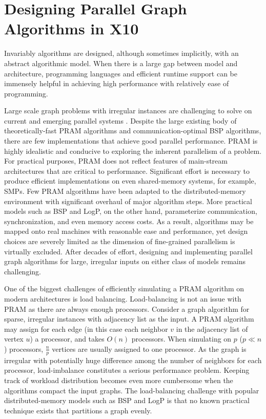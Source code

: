 
\section{Designing Parallel Graph Algorithms in X10}
\label{s:design}

 Invariably algorithms are designed, although sometimes implicitly, with an abstract algorithmic model. 
When there is a large gap between model and architecture, programming languages and efficient runtime support can be immensely helpful in achieving high performance with relatively ease of programming. 

 Large scale graph problems with irregular instances are challenging to solve on current and emerging parallel systems \cite{BC07}. Despite the large existing body of theoretically-fast PRAM algorithms and communication-optimal BSP algorithms, there are few implementations that achieve good parallel performance.
PRAM is highly idealistic and conducive to exploring the inherent parallelism of a problem. For practical purposes, PRAM does not reflect features of main-stream architectures that are critical to performance. Significant effort is necessary to produce efficient implementations on even shared-memory systems, for example, SMPs. Few PRAM algorithms have been adapted to the distributed-memory environment with significant overhaul of major algorithm steps. More practical models such as BSP and LogP, on the other hand, parameterize communication, synchronization, and even memory access costs. As a result, algorithms may be mapped onto real machines with reasonable ease and performance, yet design choices are severely limited as the dimension of fine-grained parallelism is virtually excluded. After decades of effort, designing and implementing parallel graph algorithms for large, irregular inputs on either class of models remains challenging. 

 One of the biggest challenges of efficiently simulating a PRAM algorithm on modern architectures is load balancing. Load-balancing is not an issue with PRAM as there are always enough processors. Consider a graph algorithm for sparse, irregular instances with adjacency list as the input. A PRAM algorithm may assign for each edge (in this case each neighbor $v$ in the adjacency list of vertex $u$) a processor, and takes $O(n)$ processors. When simulating on $p$ ($p\ll n$) processors, $\frac{n}{p}$ vertices are usually assigned to one processor. As the graph is irregular with potentially huge difference among the number of neighbors for each processor, load-imbalance constitutes a serious performance problem. Keeping track of workload distribution becomes even more cumbersome when the algorithms compact the input graphs. The load-balancing challenge with popular distributed-memory models such as BSP and LogP is that no known practical technique exists that partitions a graph evenly.

